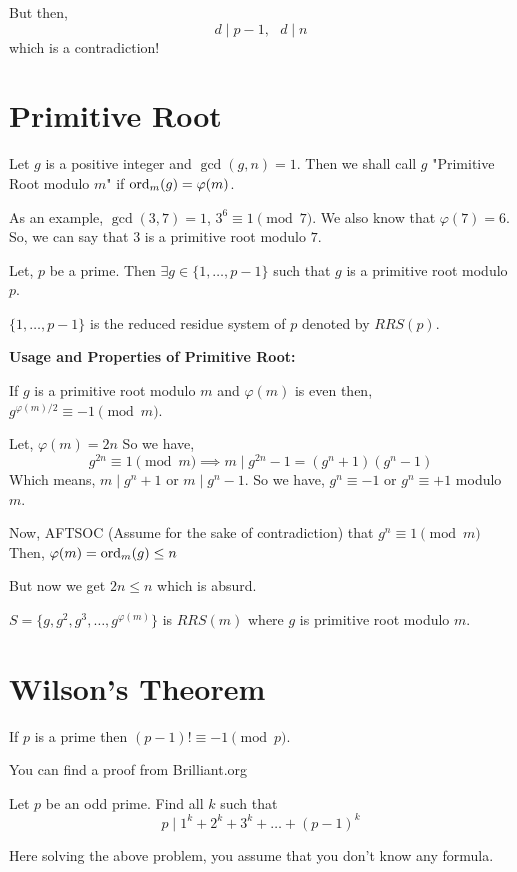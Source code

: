But then, 
\[ d\mid p-1, \ \ \ d\mid n \]
which is a contradiction! 
\section{Primitive Root}
\begin{definition}
Let $g$ is a positive integer and $\gcd(g,n)=1$. Then we shall call $g$ "Primitive Root modulo $m$" if $\operatorname{ord}_m(g)=\varphi(m)$.
\end{definition}
As an example, $\gcd(3,7)=1$, $3^6 \equiv 1 \pmod 7$.
We also know that $\varphi(7)=6$.
So, we can say that $3$ is a primitive root modulo $7$.

\begin{theorem}
Let, $p$ be a prime. Then $\exists g \in \{ 1,  \ldots, p-1 \}$ such that $g$ is a primitive root modulo $p$.
\end{theorem}
\begin{remark}
$\{1,\ldots, p-1\}$ is the reduced residue system of $p$ denoted by $RRS(p)$.
\end{remark}

\textbf{Usage and Properties of Primitive Root:}

\begin{prop}
If $g$ is a primitive root modulo $m$ and $\varphi(m)$ is even then,$g^{\varphi(m)/2}\equiv -1 \pmod m$.
\end{prop}

Let, $\varphi(m)=2n$ So we have, \[g^{2n}\equiv 1 \pmod m \implies m\mid g^{2n}-1=(g^n+1)(g^n-1)\]
Which means, $m\mid g^n+1 $ or $m\mid g^n-1$.
So we have, $g^n\equiv -1$ or $g^n\equiv +1$ modulo $m$.

Now, AFTSOC (Assume for the sake of contradiction) that 
$g^n \equiv 1 \pmod m$
Then, $\varphi(m)=\operatorname{ord}_m(g)\le n$

But now we get $2n\le n$ which is absurd.

\begin{prop}
$S=\{ g, g^2, g^3, \ldots, g^{\varphi(m)} \}$ is $RRS(m)$ where $g$ is primitive root modulo $m$.
\end{prop}




\section{Wilson's Theorem}

\begin{theorem}
If $p$ is a prime then $(p-1)!\equiv -1 \pmod p$.
\end{theorem}
You can find a proof from Brilliant.org

\begin{problem}
Let $p$ be an odd prime. Find all $k$ such that \[p\mid 1^k + 2^k + 3^k +\ldots + (p-1)^k\]
\end{problem}
Here solving the above problem, you assume that you don't know any formula.